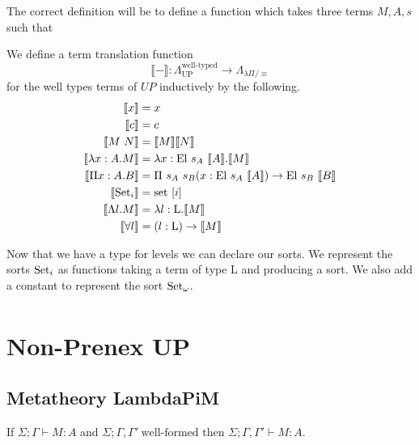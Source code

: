 \documentclass[]{StandardTemplate}
\begin{document}
The correct definition will be to define a function which takes three terms $ M, A, s $ such that 

\begin{definition}
We define a term translation function \[
\llbracket - \rrbracket : \Lambda_{\text{UP}}^\text{well-typed} \to \Lambda_{\lambda \Pi / \equiv} 
\]for the well types terms of $ UP $ inductively by the following. 
\begin{align*}
  \llbracket x \rrbracket &= x \\
  \llbracket c \rrbracket &= c \\
  \llbracket M~N \rrbracket &= \llbracket M \rrbracket \llbracket N \rrbracket \\
  \llbracket \lambda x : A. M \rrbracket &= \lambda x : \text{El}~s_A~\llbracket A \rrbracket. \llbracket M \rrbracket\\
  \llbracket \Pi x : A. B \rrbracket &= \Pi~s_A~s_B(x : \text{El}~s_A~\llbracket A \rrbracket) \to  \text{El}~s_B~\llbracket B \rrbracket\\
  \llbracket \text{Set}_i\rrbracket &= \text{set}~[i] \\
  \llbracket \Lambda l. M \rrbracket &= \lambda l : \text{L}. \llbracket M \rrbracket \\
  \llbracket \forall l  \rrbracket &= (l : \text{L}) \to \llbracket M \rrbracket
\end{align*}
\end{definition}


Now that we have a type for levels we can declare our sorts. We represent the sorts $ \text{Set}_i $ as functions taking a term of type L and producing a sort. We also add a constant to represent the sort $ \text{Set}_\omega $.
\begin{align*}
\end{align*}
\newpage

\section{Non-Prenex UP}
\label{sec:nonprenex}

\subsection{Metatheory LambdaPiM}
\label{subsec:label}

\begin{prop}[Weakening]
If   $ \Sigma; \Gamma \vdash M : A $ and $\Sigma;\Gamma,\Gamma'~\text{well-formed}$ then $ \Sigma; \Gamma, \Gamma' \vdash M : A $.
\end{prop}
\end{document}

